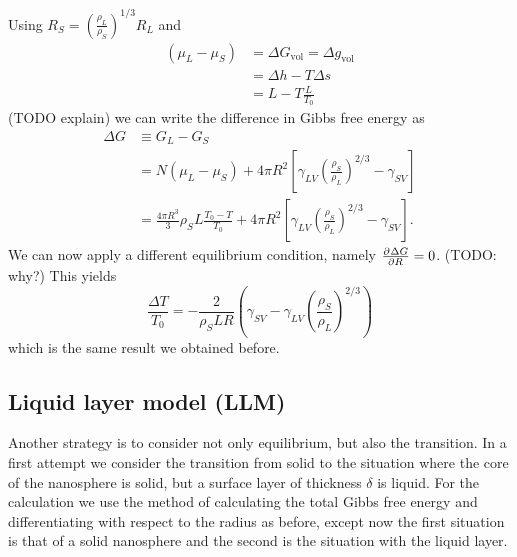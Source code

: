 Using $R_S = \left(\frac{\rho_L}{\rho_S}\right)^{1/3}R_L$ and
\begin{align*}
(\mu_L - \mu_S) &= \Delta G_\text{vol} = \Delta g_\text{vol} \\
&= \Delta h - T \Delta s \\
&= L - T \frac{L}{T_0}
\end{align*} (TODO explain)
we can write the difference in Gibbs free energy as
\begin{align*}
\Delta G &\equiv G_L - G_S \\
&= N(\mu_L-\mu_S) + 4\pi R^2 \left[\gamma_{LV} \left(\frac{\rho_S}{\rho_L}\right)^{2/3}-\gamma_{SV}\right] \\
&= \frac{4\pi R^3}{3}\rho_S L \frac{T_0-T}{T_0} + 4\pi R^2 \left[\gamma_{LV} \left(\frac{\rho_S}{\rho_L}\right)^{2/3}-\gamma_{SV}\right].
\end{align*}
We can now apply a different equilibrium condition, namely $ \frac{\partial{^{}}\Delta G}{\partial{{R}^{}}}  = 0$. (TODO: why?) This yields
\[ \frac{\Delta T}{T_0} = - \frac{2}{\rho_S LR}\left(\gamma_{SV} -  \gamma_{LV} \left(\frac{\rho_S}{\rho_L}\right)^{2/3}\right) \]
which is the same result we obtained before.


\subsection{Liquid layer model (LLM)}
Another strategy is to consider not only equilibrium, but also the transition. In a first attempt we consider the transition from solid to the situation where the core of the nanosphere is solid, but a surface layer of thickness $\delta$ is liquid. For the calculation we use the method of calculating the total Gibbs free energy and differentiating with respect to the radius as before, except now the first situation is that of a solid nanosphere and the second is the situation with the liquid layer.

